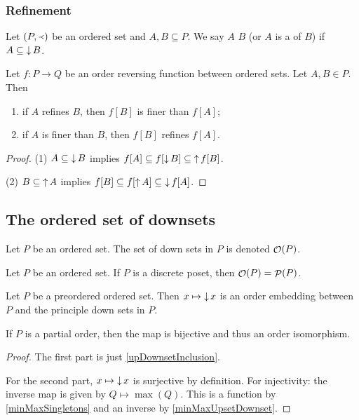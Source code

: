 \subsubsection{Refinement}
\begin{definition}
Let $\left( P,\Yleft \right)$ be an ordered set and $A,B \subseteq P$. We say $A$  $B$ (or $A$ is a  of $B$) if $A\subseteq \mathop{\downarrow} B$.
\end{definition}

\begin{lemma}
Let $f:P\to Q$ be an order reversing function between ordered sets. Let $A,B\in P$. Then
\begin{enumerate}
\item if $A$ refines $B$, then $f[B]$ is finer than $f[A]$;
\item if $A$ is finer than $B$, then $f[B]$ refines $f[A]$.
\end{enumerate}
\end{lemma}
\begin{proof}
(1) $A \subseteq \mathop{\downarrow} B$ implies $f[A] \subseteq f[\mathop{\downarrow} B] \subseteq \mathop{\uparrow} f[B]$.

(2) $B \subseteq \mathop{\uparrow} A$ implies $f[B] \subseteq f[\mathop{\uparrow} A] \subseteq \mathop{\downarrow} f[A]$.
\end{proof}

\subsection{The ordered set of downsets}
\begin{definition}
Let $P$ be an ordered set. The set of down sets in $P$ is denoted $\mathop{\mathcal{O}}(P)$.
\end{definition}

\begin{lemma}
Let $P$ be an ordered set.
If $P$ is a discrete poset, then $\mathop{\mathcal{O}}(P) = \mathop{\mathcal{P}}(P)$.
\end{lemma}

\begin{proposition} \label{orderedSetPowerset}
Let $P$ be a preordered ordered set. Then $x\mapsto \mathop{\downarrow} x$ is an order embedding between $P$ and the principle down sets in $P$.

If $P$ is a partial order, then the map is bijective and thus an order isomorphism.
\end{proposition}
\begin{proof}
The first part is just \ref{upDownsetInclusion}.

For the second part, $x\mapsto \mathop{\downarrow} x$ is surjective by definition. For injectivity: the inverse map is given by $Q\mapsto \max(Q)$. This is a function by \ref{minMaxSingletons} and an inverse by \ref{minMaxUpsetDownset}.
\end{proof}


